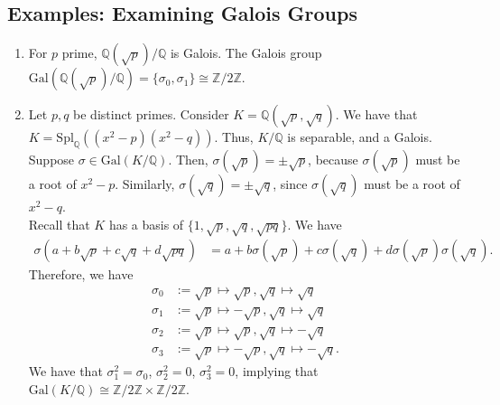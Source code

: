 \documentclass[10pt]{extarticle}
\newcommand{\Q}{\mathbb{Q}}
\newcommand{\Z}{\mathbb{Z}}
\begin{document}
  \subsection{Examples: Examining Galois Groups}%
  \begin{enumerate}[(1)]
    \item For $p$ prime, $\Q(\sqrt{p})/\Q$ is Galois. The Galois group $\text{Gal}(\Q(\sqrt{p}) / \Q) = \{\sigma_0,\sigma_1\} \cong \Z/2\Z$.
    \item Let $p,q$ be distinct primes. Consider $K = \Q(\sqrt{p},\sqrt{q})$. We have that $K = \text{Spl}_{\Q}((x^2 - p)(x^2 - q))$. Thus, $K/\Q$ is separable, and a Galois.\\

      Suppose $\sigma \in \text{Gal}(K/\Q)$. Then, $\sigma(\sqrt{p}) = \pm \sqrt{p}$, because $\sigma(\sqrt{p})$ must be a root of $x^2 - p$. Similarly, $\sigma(\sqrt{q}) = \pm \sqrt{q}$, since $\sigma(\sqrt{q})$ must be a root of $x^2 - q$.\\

      Recall that $K$ has a basis of $\{1,\sqrt{p},\sqrt{q},\sqrt{pq}\}$. We have
      \begin{align*}
        \sigma(a + b\sqrt{p} + c\sqrt{q} + d\sqrt{pq}) &= a + b\sigma(\sqrt{p}) + c\sigma(\sqrt{q}) + d\sigma(\sqrt{p})\sigma(\sqrt{q}).
      \end{align*}
      Therefore, we have
      \begin{align*}
        \sigma_0 &:=\sqrt{p}\mapsto \sqrt{p},\sqrt{q}\mapsto \sqrt{q}\\
        \sigma_1 &:=\sqrt{p}\mapsto -\sqrt{p},\sqrt{q}\mapsto \sqrt{q}\\
        \sigma_2 &:=\sqrt{p}\mapsto \sqrt{p},\sqrt{q}\mapsto -\sqrt{q}\\
        \sigma_3 &:=\sqrt{p}\mapsto -\sqrt{p},\sqrt{q}\mapsto -\sqrt{q}.
      \end{align*}
      We have that $\sigma_1^2 = \sigma_0$, $\sigma_2^2 = 0$, $\sigma_3^2 = 0$, implying that $\text{Gal}(K/\Q)\cong \Z/2\Z \times \Z/2\Z$.\\


\end{enumerate}
\end{document}
